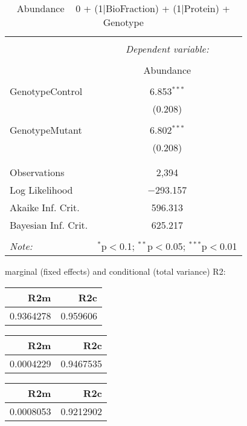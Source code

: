 \documentclass[11pt]{report}
\begin{document}
\begin{table}[!htbp] \centering 
  \caption{Abundance ~ 0 + (1|BioFraction) + (1|Protein) + Genotype} 
  \label{} 
\begin{tabular}{@{\extracolsep{5pt}}lc} 
\\[-1.8ex]\hline 
\hline \\[-1.8ex] 
 & \multicolumn{1}{c}{\textit{Dependent variable:}} \\ 
\cline{2-2} 
\\[-1.8ex] & Abundance \\ 
\hline \\[-1.8ex] 
 GenotypeControl & 6.853$^{***}$ \\ 
  & (0.208) \\ 
  & \\ 
 GenotypeMutant & 6.802$^{***}$ \\ 
  & (0.208) \\ 
  & \\ 
\hline \\[-1.8ex] 
Observations & 2,394 \\ 
Log Likelihood & $-$293.157 \\ 
Akaike Inf. Crit. & 596.313 \\ 
Bayesian Inf. Crit. & 625.217 \\ 
\hline 
\hline \\[-1.8ex] 
\textit{Note:}  & \multicolumn{1}{r}{$^{*}$p$<$0.1; $^{**}$p$<$0.05; $^{***}$p$<$0.01} \\ 
\end{tabular} 
\end{table} 
marginal (fixed effects) and conditional (total variance) R2:

\begin{tabular}{r|r}
\hline
R2m & R2c\\
\hline
0.9364278 & 0.959606\\
\hline
\end{tabular}

\begin{tabular}{r|r}
\hline
R2m & R2c\\
\hline
0.0004229 & 0.9467535\\
\hline
\end{tabular}

\begin{tabular}{r|r}
\hline
R2m & R2c\\
\hline
0.0008053 & 0.9212902\\
\hline
\end{tabular}
\end{document}
